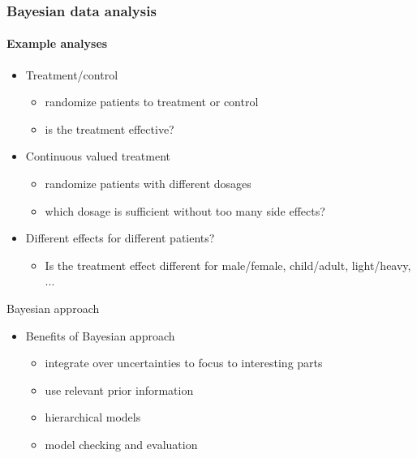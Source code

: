 \documentclass[english,t]{beamer}
\begin{document}
\begin{frame}
  \frametitle{Bayesian data analysis}  %
  \framesubtitle{Example analyses}
  \begin{itemize}
  \item Treatment/control
    \begin{itemize}
    \item randomize patients to treatment or control
    \item is the treatment effective?
    \end{itemize}
    \pause
  \item Continuous valued treatment
    \begin{itemize}
    \item randomize patients with different dosages
    \item which dosage is sufficient without too many side effects?
    \end{itemize}
    \pause
  \item Different effects for different patients?
    \begin{itemize}
    \item Is the treatment effect different for male/female, child/adult, light/heavy, ...
    \end{itemize}
  \end{itemize}

\end{frame}

\begin{frame}{Bayesian approach}

  \begin{itemize}
  \item Benefits of Bayesian approach
    \begin{itemize}
    \item integrate over uncertainties to focus to interesting parts
    \item use relevant prior information
    \item hierarchical models
    \item model checking and evaluation
    \end{itemize}
  \end{itemize}
\end{frame}
\end{document}
